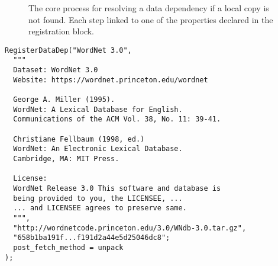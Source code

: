 \documentclass{jors}
\begin{document}
\begin{figure}
	\caption{The core process for resolving a data dependency if a local copy is not found. Each step linked to one of the properties declared in the registration block. \label{fig:retrieve}
	}
\end{figure}


\begin{lstlisting}[frame=single, caption={Example registration block for WordNet. The majority of it is a message for the user.}, label={lst:regblock}] 
  RegisterDataDep("WordNet 3.0",
  """
  Dataset: WordNet 3.0
  Website: https://wordnet.princeton.edu/wordnet

  George A. Miller (1995). 
  WordNet: A Lexical Database for English.
  Communications of the ACM Vol. 38, No. 11: 39-41.

  Christiane Fellbaum (1998, ed.) 
  WordNet: An Electronic Lexical Database. 
  Cambridge, MA: MIT Press.

  License: 
  WordNet Release 3.0 This software and database is 
  being provided to you, the LICENSEE, ... 
  ... and LICENSEE agrees to preserve same.
  """,
  "http://wordnetcode.princeton.edu/3.0/WNdb-3.0.tar.gz",
  "658b1ba191f...f191d2a44e5d25046dc8";
  post_fetch_method = unpack
);
\end{lstlisting}
\end{document}
